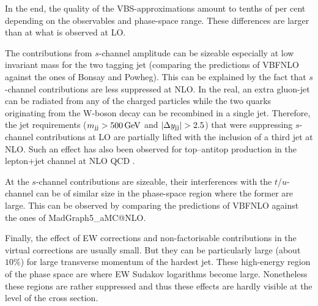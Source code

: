 In the end, the quality of the VBS-approximations amount to tenths of per cent  depending on the observables and phase-space range.
These differences are larger than at what is observed at LO.

The contributions from $s$-channel amplitude can be sizeable especially at low invariant mass for the two tagging jet (comparing the predictions of {\sc VBFNLO} against the ones of {\sc Bonsay} and {\sc Powheg}).
This can be explained by the fact that $s$-channel contributions are less suppressed at NLO.
In the real, an extra gluon-jet can be radiated from any of the charged particles while the two quarks originating from the W-boson decay can be recombined in a single jet.
Therefore, the jet requirements ($ m_{\text{j} \text{j}} >  500\,\text{GeV}$ and $|\Delta y_{\text{j} \text{j}}| > 2.5$) that were suppressing $s$-channel contributions at LO are partially lifted with the inclusion of a third jet at NLO.
Such an effect has also been observed for top--antitop production in the lepton+jet channel at NLO QCD \cite{Denner:2017kzu}.

At the $s$-channel contributions are sizeable, their interferences with the $t$/$u$-channel can be of similar size in the phase-space region where the former are large.
This can be observed by comparing the predictions of {\sc VBFNLO} against the ones of {\sc MadGraph5\_aMC\-@NLO}.

Finally, the effect of EW corrections and non-factorisable contributions in the virtual corrections are usually small.
But they can be particularly large (about $10\%$) for large transverse momentum of the hardest jet.
These high-energy region of the phase space are where EW Sudakov logarithms become large.
Nonetheless these regions are rather suppressed and thus these effects are hardly visible at the level of the cross section.

